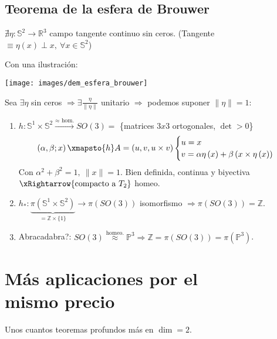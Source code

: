 \section{Teorema de la esfera de Brouwer}%
\label{sec:teorema_de_la_esfera_de_brouwer}
\begin{theo}
$\nexists \eta: \mathbb{S}^{2} \rightarrow \mathbb{R}^{3}$ campo tangente continuo sin ceros. (Tangente $\equiv \eta\left( x \right) \perp x,\ \forall x \in \mathbb{S}^{2}$)
\end{theo}
\begin{demo}
Con una ilustración:
\begin{center}
    \texttt{[image: images/dem\_esfera\_brouwer]} 
\end{center}
Sea $\exists \eta$ sin ceros $\Rightarrow \exists \frac{\eta}{\lVert \eta \rVert}$ unitario $\Rightarrow$ podemos suponer $\lVert \eta \rVert = 1$:
\begin{enumerate}
    \item $h: \mathbb{S}^{1} \times \mathbb{S}^{2} \xrightarrow{\approx \text{ hom.}} SO\left( 3 \right) = $ \{matrices $3x3$ ortogonales, $\det > 0$\}
    \[
        \left( \alpha, \beta; x \right) \xmapsto{h} A = \left( u, v, u \times v \right) \begin{cases}
            u = x\\
            v = \alpha \eta\left( x \right) + \beta\left( x \times \eta\left( x \right) \right)
        \end{cases} 
    \]
    Con $\alpha^2 + \beta^2 = 1,\ \lVert x \rVert = 1$. Bien definida, continua y biyectiva $\xRightarrow{\text{compacto a } T_2}$ homeo.

    \item $h_*: \underbrace{\pi\left( \mathbb{S}^{1} \times \mathbb{S}^{2} \right)}_{= \mathbb{Z} \times \{1\}} \rightarrow \pi\left( SO\left( 3 \right) \right)$ isomorfismo $\Rightarrow \pi\left( SO\left( 3 \right) \right) = \mathbb{Z}$.

    \item Abracadabra?: $SO\left( 3 \right) \stackrel{\text{homeo.}}{\approx} \mathbb{P}^{3} \Rightarrow \mathbb{Z} = \pi\left( SO\left( 3 \right) \right) = \pi \left( \mathbb{P}^{3} \right)$.
\end{enumerate}
\end{demo}


\chapter{Más aplicaciones por el\texorpdfstring{\\}{} mismo precio}%
\label{cha:mas_aplicaciones_por_el_mismo_precio}
Unos cuantos teoremas profundos más en $\dim = 2$.
